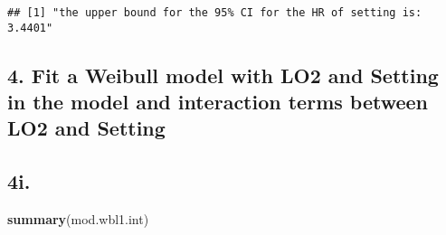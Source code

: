 \documentclass[]{article}
\newenvironment{Shaded}{\begin{snugshade}}{\end{snugshade}}
\newcommand{\DataTypeTok}[1]{\textcolor[rgb]{0.13,0.29,0.53}{#1}}
\newcommand{\DecValTok}[1]{\textcolor[rgb]{0.00,0.00,0.81}{#1}}
\newcommand{\KeywordTok}[1]{\textcolor[rgb]{0.13,0.29,0.53}{\textbf{#1}}}
\newcommand{\NormalTok}[1]{#1}
\newcommand{\OperatorTok}[1]{\textcolor[rgb]{0.81,0.36,0.00}{\textbf{#1}}}
\newcommand{\StringTok}[1]{\textcolor[rgb]{0.31,0.60,0.02}{#1}}
\begin{document}
\begin{Shaded}
\end{Shaded}

\begin{verbatim}
## [1] "the upper bound for the 95% CI for the HR of setting is: 3.4401"
\end{verbatim}

\hypertarget{fit-a-weibull-model-with-lo2-and-setting-in-the-model-and-interaction-terms-between-lo2-and-setting}{%
\subsection{4. Fit a Weibull model with LO2 and Setting in the model and
interaction terms between LO2 and
Setting}\label{fit-a-weibull-model-with-lo2-and-setting-in-the-model-and-interaction-terms-between-lo2-and-setting}}

\begin{Shaded}
\end{Shaded}

\hypertarget{i.-1}{%
\subsection{4i.}\label{i.-1}}

\begin{Shaded}
\begin{Highlighting}[]
\KeywordTok{summary}\NormalTok{(mod.wbl1.int)}
\end{Highlighting}
\end{Shaded}
\end{document}
